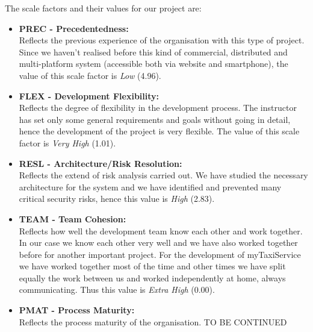\documentclass[\mainpath/main]{subfiles}
\begin{document}
The scale factors and their values for our project are:


\begin{itemize}
	\item \textbf{PREC - Precedentedness:}\\
	Reflects the previous experience of the organisation with this type of project. Since we haven't realised before this kind of commercial, distributed and multi-platform system (accessible both via website and smartphone), the value of this scale factor is \textit{Low} (4.96).
	
	\item  \textbf{FLEX - Development Flexibility:}\\
	Reflects the degree of flexibility in the development process. The instructor has set only some general requirements and goals without going in detail, hence the development of the project is very flexible. The value of this scale factor is \textit{Very High} (1.01).
	
	\item \textbf{RESL - Architecture/Risk Resolution:}\\
	Reflects the extend of risk analysis carried out. We have studied the necessary architecture for the system and we have identified and prevented many critical security risks, hence this value is \textit{High} (2.83).
	
	\item \textbf{TEAM - Team Cohesion:}\\
	Reflects how well the development team know each other and work together. In our case we know each other very well and we have also worked together before for another important project. For the development of myTaxiService we have worked together most of the time and other times we have split equally the work between us and worked independently at home, always communicating. Thus this value is \textit{Extra High} (0.00).
	
	\item \textbf{PMAT - Process Maturity:}\\
	Reflects the process maturity of the organisation. TO BE CONTINUED
	\\
\end{itemize}
\end{document}
